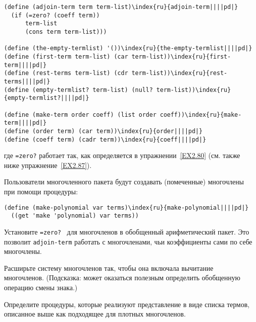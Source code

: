\begin{Verbatim}[fontsize=\small]
(define (adjoin-term term term-list)\index{ru}{adjoin-term||||pd|}
  (if (=zero? (coeff term))
      term-list
      (cons term term-list)))

(define (the-empty-termlist) '())\index{ru}{the-empty-termlist||||pd|}
(define (first-term term-list) (car term-list))\index{ru}{first-term||||pd|}
(define (rest-terms term-list) (cdr term-list))\index{ru}{rest-terms||||pd|}
(define (empty-termlist? term-list) (null? term-list))\index{ru}{empty-termlist?||||pd|}

(define (make-term order coeff) (list order coeff))\index{ru}{make-term||||pd|}
(define (order term) (car term))\index{ru}{order||||pd|}
(define (coeff term) (cadr term))\index{ru}{coeff||||pd|}
\end{Verbatim}
где {\tt =zero?} работает так, как определяется в 
упражнении~\ref{EX2.80} (см. также ниже
упражнение~\ref{EX2.87}).

Пользователи многочленного пакета будут создавать
(помеченные) многочлены при помощи процедуры:

\begin{Verbatim}[fontsize=\small]
(define (make-polynomial var terms)\index{ru}{make-polynomial||||pd|}
  ((get 'make 'polynomial) var terms))
\end{Verbatim}

\begin{exercise}{2.87}\label{EX2.87}%
Установите 
{\tt =zero?
 } для многочленов в
обобщенный арифметический пакет.  Это позволит
{\tt adjoin-term} работать с многочленами, чьи коэффициенты
сами по себе многочлены.
\end{exercise}

\begin{exercise}{2.88}\label{EX2.88}%
Расширьте систему многочленов так, чтобы она включала
вычитание многочленов.  (Подсказка: может оказаться полезным 
определить обобщенную операцию смены знака.)
\end{exercise}
\begin{exercise}{2.89}\label{EX2.89}%
Определите процедуры, которые реализуют представление в
виде списка термов, описанное выше как подходящее для плотных
многочленов.
\end{exercise}

